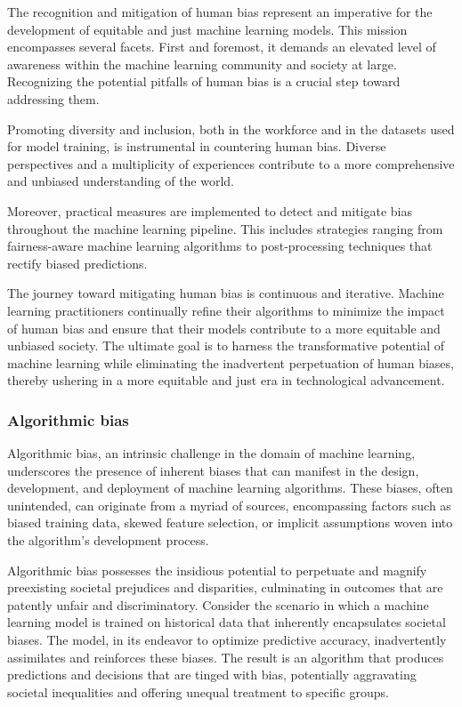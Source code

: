 \documentclass[12pt,a4paper,openright,twoside]{book}
\begin{document}
The recognition and mitigation of human bias represent an imperative for the development of equitable and just machine learning models. This mission encompasses several facets. First and foremost, it demands an elevated level of awareness within the machine learning community and society at large. Recognizing the potential pitfalls of human bias is a crucial step toward addressing them. 

Promoting diversity and inclusion, both in the workforce and in the datasets used for model training, is instrumental in countering human bias. Diverse perspectives and a multiplicity of experiences contribute to a more comprehensive and unbiased understanding of the world. 

Moreover, practical measures are implemented to detect and mitigate bias throughout the machine learning pipeline. This includes strategies ranging from fairness-aware machine learning algorithms to post-processing techniques that rectify biased predictions. 

The journey toward mitigating human bias is continuous and iterative. Machine learning practitioners continually refine their algorithms to minimize the impact of human bias and ensure that their models contribute to a more equitable and unbiased society. The ultimate goal is to harness the transformative potential of machine learning while eliminating the inadvertent perpetuation of human biases, thereby ushering in a more equitable and just era in technological advancement.

\subsubsection{Algorithmic bias}

Algorithmic bias, an intrinsic challenge in the domain of machine learning, underscores the presence of inherent biases that can manifest in the design, development, and deployment of machine learning algorithms. These biases, often unintended, can originate from a myriad of sources, encompassing factors such as biased training data, skewed feature selection, or implicit assumptions woven into the algorithm's development process. 

Algorithmic bias possesses the insidious potential to perpetuate and magnify preexisting societal prejudices and disparities, culminating in outcomes that are patently unfair and discriminatory. Consider the scenario in which a machine learning model is trained on historical data that inherently encapsulates societal biases. The model, in its endeavor to optimize predictive accuracy, inadvertently assimilates and reinforces these biases. The result is an algorithm that produces predictions and decisions that are tinged with bias, potentially aggravating societal inequalities and offering unequal treatment to specific groups. \cite{10.1145/2983270} 
\end{document}
